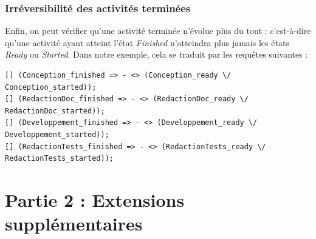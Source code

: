 \documentclass{report}
\begin{document}
\subsection{Irréversibilité des activités terminées}

Enfin, on peut vérifier qu'une activité terminée n'évolue plus du tout : c'est-à-dire qu'une activité ayant atteint l'état \textit{Finished} n'atteindra plus jamais les états \textit{Ready} ou \textit{Started}. Dans notre exemple, cela se traduit par les requêtes suivantes :

\begin{verbatim}
[] (Conception_finished => - <> (Conception_ready \/ Conception_started));
[] (RedactionDoc_finished => - <> (RedactionDoc_ready \/ RedactionDoc_started));
[] (Developpement_finished => - <> (Developpement_ready \/ Developpement_started));
[] (RedactionTests_finished => - <> (RedactionTests_ready \/ RedactionTests_started));
\end{verbatim}

\chapter{Partie 2 : Extensions supplémentaires}


\end{document}
